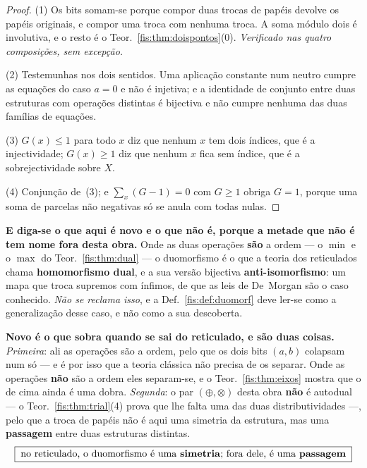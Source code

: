 \documentclass[livro.tex]{subfiles}
\begin{document}
\begin{proof}
(1) Os bits somam-se porque compor duas trocas de papéis devolve os papéis
originais, e compor uma troca com nenhuma troca. A soma módulo dois é involutiva,
e o resto é o Teor.~\ref{fis:thm:doispontos}(0). \emph{Verificado nas quatro
composições, sem excepção.}

(2) Testemunhas nos dois sentidos. Uma aplicação constante num neutro cumpre as
equações do caso $a=0$ e não é injetiva; e a identidade de conjunto entre duas
estruturas com operações distintas é bijectiva e não cumpre nenhuma das duas
famílias de equações.

(3) $G(x)\le1$ para todo $x$ diz que nenhum $x$ tem dois índices, que é a
injectividade; $G(x)\ge1$ diz que nenhum $x$ fica sem índice, que é a
sobrejectividade sobre $X$.

(4) Conjunção de~(3); e $\sum_x(G-1)=0$ com $G\ge1$ obriga $G=1$, porque uma
soma de parcelas não negativas só se anula com todas nulas.
\end{proof}


\medskip\noindent\textbf{E diga-se o que aqui é novo e o que não é, porque a
metade que não é tem nome fora desta obra.} Onde as duas operações \textbf{são} a
ordem --- o $\min$ e o $\max$ do Teor.~\ref{fis:thm:dual} --- o duomorfismo é o
que a teoria dos reticulados chama \textbf{homomorfismo dual}, e a sua versão
bijectiva \textbf{anti-isomorfismo}: um mapa que troca supremos com ínfimos, de
que as leis de De~Morgan são o caso conhecido. \emph{Não se reclama isso}, e a
Def.~\ref{fis:def:duomorf} deve ler-se como a generalização desse caso, e não
como a sua descoberta.

\medskip\noindent\textbf{Novo é o que sobra quando se sai do reticulado, e são
duas coisas.} \emph{Primeira}: ali as operações são a ordem, pelo que os dois
bits $(a,b)$ colapsam num só --- e é por isso que a teoria clássica não precisa
de os separar. Onde as operações \textbf{não} são a ordem eles separam-se, e o
Teor.~\ref{fis:thm:eixos} mostra que o de cima ainda é uma dobra. \emph{Segunda}:
o par $(\oplus,\otimes)$ desta obra \textbf{não} é autodual --- o
Teor.~\ref{fis:thm:trial}(4) prova que lhe falta uma das duas distributividades
---, pelo que a troca de papéis não é aqui uma simetria da estrutura, mas uma
\textbf{passagem} entre duas estruturas distintas.
\[
\boxed{\;\text{no reticulado, o duomorfismo é uma \textbf{simetria}; fora dele, é uma \textbf{passagem}}\;}
\]
\end{document}

